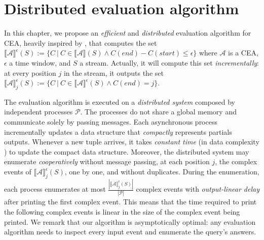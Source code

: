 \chapter{Distributed evaluation algorithm}\label{chapter:algorithm}


In this chapter, we propose an \emph{efficient} and \emph{distributed} evaluation algorithm for CEA, heavily inspired by \cite{core}, that computes the set ${\llbracket \mathcal{A} \rrbracket}^{\epsilon}(S) := \{ C \ | \ C \in {\llbracket \mathcal{A} \rrbracket}(S) \land C(end) - C(start) \le \epsilon\}$ where $\mathcal{A}$ is a CEA, $\epsilon$ a time window, and $S$ a stream. Actually, it will compute this set \emph{incrementally}: at every position $j$ in the stream, it outputs the set ${\llbracket \mathcal{A} \rrbracket}^{\epsilon}_{j}(S) := \{ C \ | \ C \in {\llbracket \mathcal{A} \rrbracket}^{\epsilon}(S) \land C(end) = j \}$.

The evaluation algorithm is executed on a \emph{distributed system} composed by independent processes $\mathcal{P}$. The processes do not share a global memory and communicate solely by passing messages. Each asynchronous process incrementally updates a data structure that \emph{compactly} represents partials outputs. Whenever a new tuple arrives, it takes \emph{constant time} (in data complexity \cite{data-complexity}) to update the compact data structure. Moreover, the distributed system may enumerate \emph{cooperatively} without message passing, at each position $j$, the complex events of ${\llbracket \mathcal{A} \rrbracket}^{\epsilon}_{j}(S)$, one by one, and without duplicates. During the enumeration, each process enumerates at most $\frac{|{\llbracket \mathcal{A} \rrbracket}^{\epsilon}_{j}(S)|}{|\mathcal{P}|}$ complex events with \emph{output-linear delay} after printing the first complex event. This means that the time required to print the following complex events is linear in the size of the complex event being printed. We remark that our algorithm is asymptotically optimal: any evaluation algorithm needs to inspect every input event and enumerate the query's answers.

